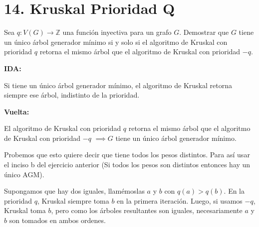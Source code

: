 \documentclass{article}
\begin{document}
\section*{14. Kruskal Prioridad Q}

Sea $q : V(G) \rightarrow \mathbb{Z}$ una función inyectiva para un grafo $G$. Demostrar que $G$ tiene un único árbol generador mínimo si y solo si el algoritmo de Kruskal con prioridad $q$ retorna el mismo árbol que el algoritmo de Kruskal con prioridad $-q$.

\textbf{IDA:}

Si tiene un único árbol generador mínimo, el algoritmo de Kruskal retorna siempre ese árbol, indistinto de la prioridad.

\textbf{Vuelta:}

El algoritmo de Kruskal con prioridad $q$ retorna el mismo árbol que el algoritmo de Kruskal con prioridad $-q$ $\implies G$ tiene un único árbol generador mínimo.

Probemos que esto quiere decir que tiene todos los pesos distintos. Para así usar el inciso b del ejercicio anterior (Si todos los pesos son distintos entonces hay un único AGM).

Supongamos que hay dos iguales, llamémoslas $a$ y $b$ con $q(a) > q(b)$. En la prioridad $q$, Kruskal siempre toma $b$ en la primera iteración. Luego, si usamos $-q$, Kruskal toma $b$, pero como los árboles resultantes son iguales, necesariamente $a$ y $b$ son tomados en ambos ordenes. 
\end{document}
